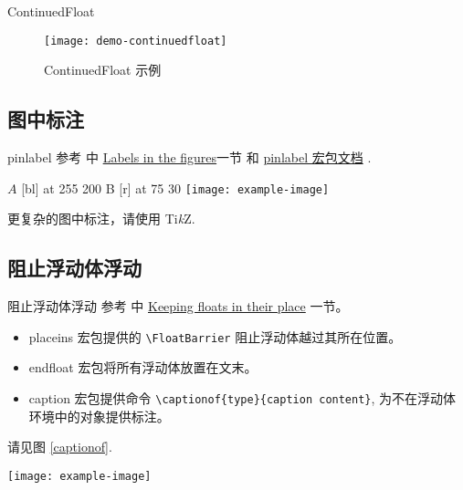\documentclass[final]{ctexbeamer}
\begin{document}
\begin{frame}[fragile]{ContinuedFloat}
\end{frame}


\begin{frame}
\begin{figure}[]
  \centering
  \texttt{[image: demo-continuedfloat]}
  \caption{ContinuedFloat 示例}
  \label{demo-continuedfloat}
\end{figure}
\end{frame}



\subsection{图中标注}
% 
\begin{frame}[fragile]{pinlabel}
参考 \cite{wiki:floats} 中 \href{https://en.wikibooks.org/wiki/LaTeX/Floats,\_Figures\_and\_Captions\#Labels\_in\_the\_figures}{Labels in the figures}一节 和 \href{http://mirrors.ctan.org/macros/latex/contrib/pinlabel/pinlabdoc.pdf}{pinlabel 宏包文档} \cite{pinlabel}.
\begin{vertlst}
 \small\hair 2pt
\pinlabel $A$ [bl] at 255 200
\pinlabel B [r] at 75 30
\endlabellist
\centering
\texttt{[image: example-image]}
\end{vertlst}
更复杂的图中标注，请使用 Ti\emph{k}Z.
\end{frame}



\subsection{阻止浮动体浮动}
% 
\begin{frame}[fragile]{阻止浮动体浮动}
参考 \cite{wiki:floats} 中 \href{https://en.wikibooks.org/wiki/LaTeX/Floats,\_Figures\_and\_Captions\#Keeping\_floats\_in\_their\_place}{Keeping floats in their place} 一节。
\begin{itemize}
  \item\label{FloatBarrier} placeins 宏包提供的 \verb+\FloatBarrier+ 阻止浮动体越过其所在位置。
  \item\label{endfloat} endfloat 宏包将所有浮动体放置在文末。
  \item caption 宏包提供命令 \verb+\captionof{type}{caption content}+, 为不在浮动体环境中的对象提供标注。
\end{itemize}
\begin{sidelst}
请见图 \ref{captionof}.

\texttt{[image: example-image]}
\label{captionof}
\end{sidelst}
\end{frame}
\end{document}
